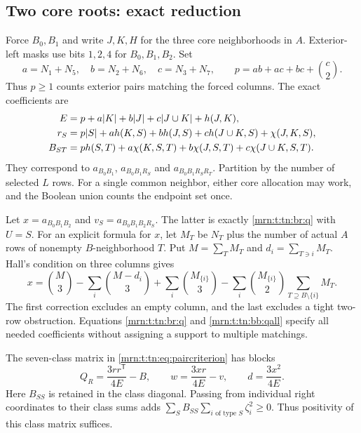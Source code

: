 \documentclass[11pt,a4paper]{article}
\theoremstyle{remark}\newtheorem{remark}[theorem]{Remark}
\begin{document}
\subsection{Two core roots: exact reduction}
Force $B_0,B_1$ and write $J,K,H$ for the three core neighborhoods in $A$.
Exterior-left masks use bits $1,2,4$ for $B_0,B_1,B_2$.
Set
\[
 a=N_1+N_5,\quad b=N_2+N_6,\quad c=N_3+N_7,\qquad
 p=ab+ac+bc+\binom c2.
\]
Thus $p\ge1$ counts exterior pairs matching the forced columns.
The exact coefficients are
\begin{align}
 E&=p+a|K|+b|J|+c|J\cup K|+h(J,K),\notag\\
 r_S&=p|S|+ah(K,S)+bh(J,S)+ch(J\cup K,S)+\chi(J,K,S),\label{mrn:t:tn:bb:counts}\\
 B_{ST}&=ph(S,T)+a\chi(K,S,T)+b\chi(J,S,T)
                                  +c\chi(J\cup K,S,T).\notag
\end{align}
They correspond to $a_{B_0B_1}$, $a_{B_0B_1R_S}$ and
$a_{B_0B_1R_SR_T}$. Partition by the number of selected $L$ rows.
For a single common neighbor, either core allocation may work, and the
Boolean union counts the endpoint set once.

Let $x=a_{B_0B_1B_2}$ and $v_S=a_{B_0B_1B_2R_S}$.
The latter is exactly \eqref{mrn:t:tn:br:q} with $U=S$.
For an explicit formula for $x$, let $M_T$ be $N_T$ plus the number of
actual $A$ rows of nonempty $B$-neighborhood $T$. Put
$M=\sum_T M_T$ and $d_i=\sum_{T\ni i}M_T$. Hall's condition on three
columns gives
\begin{equation}\label{mrn:t:tn:bb:qall}
 x=\binom M3-\sum_i\binom{M-d_i}{3}
       +\sum_i\binom{M_{\{i\}}}{3}
       -\sum_i\binom{M_{\{i\}}}{2}
                      \sum_{T\supseteq B\setminus\{i\}}M_T .
\end{equation}
The first correction excludes an empty column, and the last excludes a
tight two-row obstruction. Equations \eqref{mrn:t:tn:br:q} and \eqref{mrn:t:tn:bb:qall}
specify all needed coefficients without assigning a support to multiple
matchings.

The seven-class matrix in \eqref{mrn:t:tn:eq:paircriterion} has blocks
\begin{equation}\label{mrn:t:tn:bb:matrix}
 Q_R=\frac{3rr^{\mathsf T}}{4E}-B,\qquad
 w=\frac{3xr}{4E}-v,\qquad d=\frac{3x^2}{4E}.
\end{equation}
Here $B_{SS}$ is retained in the class diagonal. Passing from individual
right coordinates to their class sums adds
$\sum_S B_{SS}\sum_{i\text{ of type }S}\zeta_i^2\ge0$.
Thus positivity of this class matrix suffices.
\end{document}
